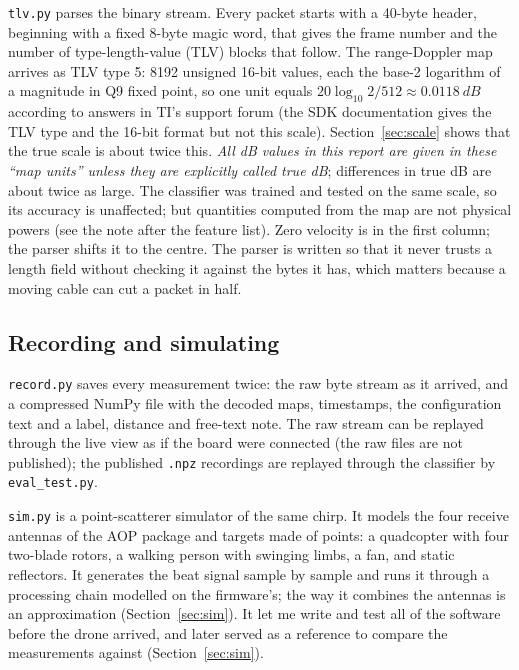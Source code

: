 \documentclass[11pt,a4paper]{article}
\begin{document}
\texttt{tlv.py} parses the binary stream. Every packet starts with a 40-byte header, beginning with a fixed 8-byte magic word, that gives the frame number and the number of type-length-value (TLV) blocks that follow. The range-Doppler map arrives as TLV type 5: 8192 unsigned 16-bit values, each the base-2 logarithm of a magnitude in Q9 fixed point, so one unit equals $20\log_{10}2/512 \approx \SI{0.0118}{dB}$ according to answers in TI's support forum (the SDK documentation \cite{ti-uart} gives the TLV type and the 16-bit format but not this scale). Section~\ref{sec:scale} shows that the true scale is about twice this. \emph{All dB values in this report are given in these ``map units'' unless they are explicitly called true dB}; differences in true dB are about twice as large. The classifier was trained and tested on the same scale, so its accuracy is unaffected; but quantities computed from the map are not physical powers (see the note after the feature list). Zero velocity is in the first column; the parser shifts it to the centre. The parser is written so that it never trusts a length field without checking it against the bytes it has, which matters because a moving cable can cut a packet in half.

\subsection{Recording and simulating}

\texttt{record.py} saves every measurement twice: the raw byte stream as it arrived, and a compressed NumPy file with the decoded maps, timestamps, the configuration text and a label, distance and free-text note. The raw stream can be replayed through the live view as if the board were connected (the raw files are not published); the published \texttt{.npz} recordings are replayed through the classifier by \texttt{eval\_test.py}.

\texttt{sim.py} is a point-scatterer simulator of the same chirp. It models the four receive antennas of the AOP package and targets made of points: a quadcopter with four two-blade rotors, a walking person with swinging limbs, a fan, and static reflectors. It generates the beat signal sample by sample and runs it through a processing chain modelled on the firmware's; the way it combines the antennas is an approximation (Section~\ref{sec:sim}). It let me write and test all of the software before the drone arrived, and later served as a reference to compare the measurements against (Section~\ref{sec:sim}).
\end{document}
